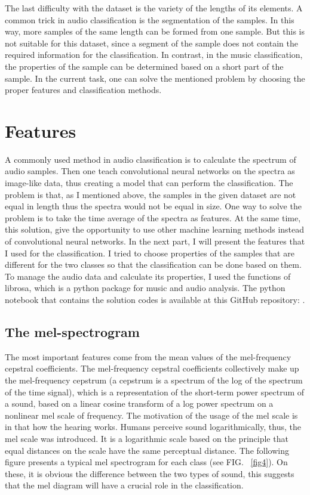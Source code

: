 \documentclass[12pt a4paper]{article}
\numberwithin{equation}{section}
\begin{document}
The last difficulty with the dataset is the variety of the lengths of its elements. A common trick in audio classification is the segmentation of the samples. In this way, more samples of the same length can be formed from one sample.  But this is not suitable for this dataset, since a segment of the sample does not contain the required information for the classification. In contrast, in the music classification, the properties of the sample can be determined based on a short part of the sample. In the current task, one can solve the mentioned problem by choosing the proper features and classification methods.

\section{Features}

A commonly used method in audio classification is to calculate the spectrum of audio samples. Then one teach convolutional neural networks on the spectra as image-like data, thus creating a model that can perform the classification. The problem is that, as I mentioned above, the samples in the given dataset are not equal in length thus the spectra would not be equal in size.  One way to solve the problem is to take the time average of the spectra as features. At the same time, this solution, give the opportunity to use other machine learning methods instead of convolutional neural networks. In the next part, I will present the features that I used for the classification. 
I tried to choose properties of the samples that are different for the two classes so that the classification can be done based on them. To manage the audio data and calculate its properties, I used the functions of librosa, which is a python package for music and audio analysis. The python notebook that contains the solution codes is available at this GitHub repository: \cite{repo}.
 
\subsection{The mel-spectrogram}

The most important features come from the mean values of the mel-frequency cepstral coefficients. The mel-frequency cepstral coefficients collectively make up the mel-frequency cepstrum (a cepstrum is a spectrum of the log of the spectrum of the time signal), which is a representation of the short-term power spectrum of a sound, based on a linear cosine transform of a log power spectrum on a nonlinear mel scale of frequency. The motivation of the usage of the mel scale is in that how the hearing works.  Humans perceive sound logarithmically, thus, the mel scale was introduced. It is a logarithmic scale based on the principle that equal distances on the scale have the same perceptual distance. The following figure presents a typical mel spectrogram for each class (see FIG. ~\ref{fig4}). On these, it is obvious the difference between the two types of sound, this suggests that the mel diagram will have a crucial role in the classification.
\end{document}
